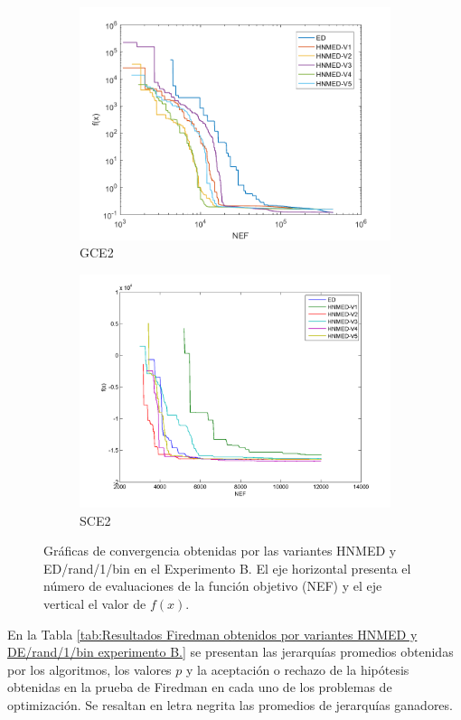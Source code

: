 \begin{figure}
\begin{subfigure}[b]{0.49\linewidth}
		\includegraphics[width=\linewidth]{Figures/B-Grafica_Convergencia_Problema_5}
		\caption{GCE2} \label{fig:G2} 
	\end{subfigure}
	\begin{subfigure}[b]{0.49\linewidth}
		\includegraphics[width=\linewidth]{Figures/B-Grafica_Convergencia_Problema_6}
		\caption{SCE2} \label{fig:S1} 
	\end{subfigure}
	\caption[Gráficas de convergencia obtenidas por las variantes HNMED y ED/rand/1/bin en el Experimento B.]{Gráficas de convergencia obtenidas por las variantes HNMED y ED/rand/1/bin en el Experimento B. El eje horizontal presenta el número de evaluaciones de la función objetivo (NEF) y el eje vertical el valor de  $f(x)$.  } \label{fig: Gráficas de convergencia para las variantes HNMED y ED/rand/1/bin} 
	
\end{figure}
En la Tabla \ref{tab:Resultados Firedman obtenidos por variantes HNMED y DE/rand/1/bin  experimento B.} se presentan las jerarquías promedios obtenidas por los algoritmos, los valores $p$ y la aceptación o rechazo de la hipótesis obtenidas en la prueba de Firedman en cada uno de los problemas de optimización. Se resaltan en letra negrita las promedios de jerarquías ganadores.

